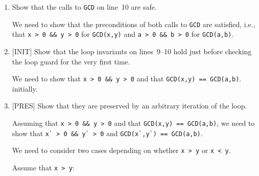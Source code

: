 \begin{flex}
\begin{solution}
\label{ex:contracts:euclid-solved}

\begin{enumerate}[label=\alph*)]
\item%
  Show that the calls to \lstinline'GCD' on line~10
  are safe.

  We need to show that the preconditions of both calls to
  \lstinline'GCD' are satisfied, i.e., %
  that \lstinline'x > 0 && y > 0' for \lstinline'GCD(x,y)'
  and \lstinline'a > 0 && b > 0' for \lstinline'GCD(a,b)'.

  \begin{enumerate}[label=\Alph*.]
  \end{enumerate}


\item {[INIT]} %
  Show that the loop invariants on
  lines~9--10 hold just before
  checking the loop guard for the very first time.

  We need to show that \lstinline'x > 0 && y > 0' and that
  \lstinline'GCD(x,y) == GCD(a,b)'. initially.
  \begin{enumerate}[label=\Alph*.]
  \end{enumerate}

\item {[PRES]} %
  Show that they are preserved by an arbitrary iteration of the loop.

  Assuming that \lstinline'x > 0 && y > 0' and that %
  \lstinline'GCD(x,y) == GCD(a,b)', we need to show that
  \lstinline'x` > 0 && y` > 0' and %
  \lstinline'GCD(x`,y`) == GCD(a,b)'.

  We need to consider two cases depending on whether
  \lstinline'x > y' or \lstinline'x < y'.

  Assume that \lstinline'x > y':
  \begin{enumerate}[label=\Alph*.]
  \end{enumerate}


\end{enumerate}
\end{solution}
\end{flex}
